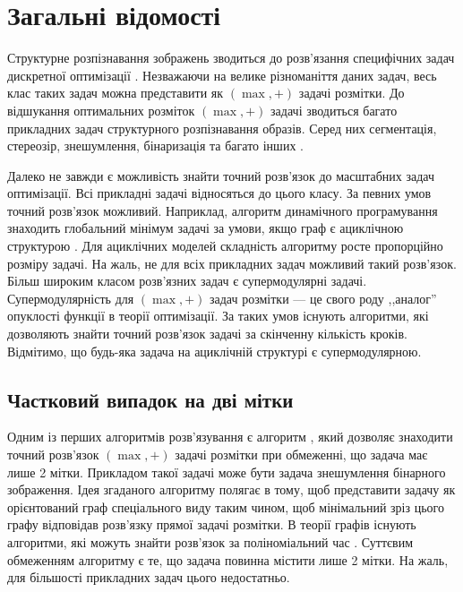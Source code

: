 \section{Загальні відомості}

\vspace{-\baselineskip}

Структурне розпізнавання зображень зводиться до розв'язання специфічних
задач дискретної оптимізації \cite{SchlGig_1_usim2007, Boykov, Boykov_2, savchynskyy}. Незважаючи на велике різноманіття даних задач,
весь клас таких задач можна представити як \((\max,+)\) задачі розмітки.
До відшукання оптимальних розміток \((\max,+)\) задачі зводиться багато
прикладних задач структурного розпізнавання образів. Серед них сегментація,
стереозір, знешумлення, бінаризація та багато інших \cite{WANG20131610, Boykov_2, comp_vision}.

Далеко не завжди є можливість знайти точний розв'язок до
масштабних задач оптимізації. Всі прикладні задачі відносяться до цього класу.
За певних умов точний розв'язок можливий. Наприклад, алгоритм динамічного програмування
знаходить глобальний мінімум задачі за умови, якщо граф є ациклічною
структурою \cite{ten_lectures}. Для ациклічних моделей складність алгоритму росте пропорційно
розміру задачі.
На жаль, не для всіх прикладних задач можливий такий розв'язок.
Більш широким класом розв'язних задач є супермодулярні задачі. Супермодулярність
для \((\max,+)\) задач розмітки --- це свого роду ,,аналог'' опуклості функції в теорії
оптимізації. За таких умов існують алгоритми, які дозволяють знайти
точний розв'язок задачі за скінченну кількість кроків.
Відмітимо, що будь-яка задача на ациклічній структурі є супермодулярною.

\subsection{Частковий випадок на дві мітки}
Одним із перших алгоритмів розв'язування є алгоритм \cite{Greig_port}, який
дозволяє знаходити точний розв'язок \((\max,+)\) задачі розмітки при обмеженні, що
задача має лише 2 мітки. Прикладом такої задачі може бути задача знешумлення
бінарного зображення.
Ідея згаданого алгоритму полягає в тому, щоб
представити задачу як орієнтований граф спеціального виду таким чином, щоб
мінімальний зріз цього графу відповідав розв'язку прямої задачі розмітки.
В теорії графів існують алгоритми, які можуть знайти розв'язок за поліноміальний
час \cite{Boykov, Boykov_2, ford}. Суттєвим обмеженням алгоритму є те, що задача повинна містити лише 2 мітки.
На жаль, для більшості прикладних задач цього недостатньо.


